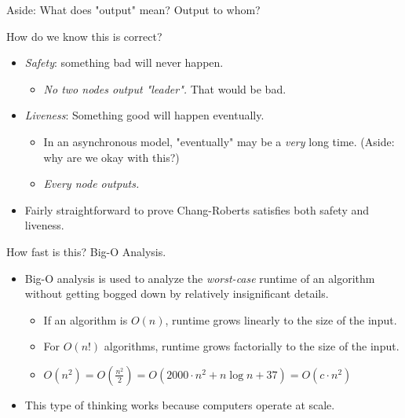 \documentclass[aspectratio=169]{beamer}
\begin{document}
\begin{frame}{Aside: What does "output" mean?}
    Output to whom?
\end{frame}


\begin{frame}{How do we know this is correct?}
    \begin{itemize}
        \item \emph{Safety}: something bad will never happen.
        \begin{itemize}
            \item \textit{No two nodes output "leader".} That would be bad.
        \end{itemize}
        \item \emph{Liveness}: Something good will happen eventually.
        \begin{itemize}
            \item In an asynchronous model, "eventually" may be a \textit{very} long time. (Aside: why are we okay with this?)
            \item \textit{Every node outputs.}
        \end{itemize}\pause
        \item Fairly straightforward to prove Chang-Roberts satisfies both safety and liveness.
    \end{itemize}
\end{frame}


\begin{frame}{How fast is this? Big-O Analysis.}
    \begin{itemize}
        \item Big-O analysis is used to analyze the \textit{worst-case} runtime of an algorithm without getting bogged down by relatively insignificant details. \pause
        \begin{itemize}
            \item If an algorithm is \emph{$O(n)$}, runtime grows linearly to the size of the input. \pause
            \item For \emph{$O(n!)$} algorithms, runtime grows factorially to the size of the input. \pause
            \item $O(n^2) = O(\frac{n^2}{2}) = O(2000 \cdot n^2 + n\log n + 37) = O(c \cdot n^2)$ \pause
        \end{itemize}
        \item This type of thinking works because computers operate at scale.
    \end{itemize}
\end{frame}
\end{document}
